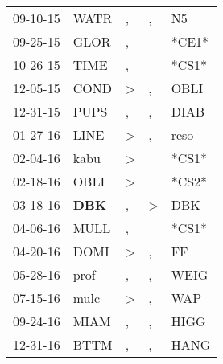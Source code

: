\begin{supertabular}{p{0.07\textwidth}p{0.06\textwidth}p{0.02\textwidth}p{0.02\textwidth}p{0.06\textwidth}}
 09-10-15\textsuperscript{} &           WATR\textsuperscript{} &                , &             , &           N5\textsuperscript{} \\
 09-25-15\textsuperscript{} &           GLOR\textsuperscript{} &                , &               &                          *CE1* \\
 10-26-15\textsuperscript{} &           TIME\textsuperscript{} &                , &               &                          *CS1* \\
 12-05-15\textsuperscript{} &           COND\textsuperscript{} &     \textgreater &             , &         OBLI\textsuperscript{} \\
 12-31-15\textsuperscript{} &           PUPS\textsuperscript{} &                , &             , &         DIAB\textsuperscript{} \\
 01-27-16\textsuperscript{} &           LINE\textsuperscript{} &     \textgreater &             , &         reso\textsuperscript{} \\
 02-04-16\textsuperscript{} &           kabu\textsuperscript{} &     \textgreater &               &                          *CS1* \\
 02-18-16\textsuperscript{} &           OBLI\textsuperscript{} &     \textgreater &               &                          *CS2* \\
 03-18-16\textsuperscript{} &   \textbf{DBK\textsuperscript{}} &                , &  \textgreater &          DBK\textsuperscript{} \\
 04-06-16\textsuperscript{} &           MULL\textsuperscript{} &                , &               &                          *CS1* \\
 04-20-16\textsuperscript{} &           DOMI\textsuperscript{} &     \textgreater &             , &           FF\textsuperscript{} \\
 05-28-16\textsuperscript{} &           prof\textsuperscript{} &                , &             , &         WEIG\textsuperscript{} \\
 07-15-16\textsuperscript{} &           mulc\textsuperscript{} &     \textgreater &             , &          WAP\textsuperscript{} \\
 09-24-16\textsuperscript{} &           MIAM\textsuperscript{} &                , &             , &         HIGG\textsuperscript{} \\
 12-31-16\textsuperscript{} &           BTTM\textsuperscript{} &                , &             , &         HANG\textsuperscript{} \\

\end{supertabular}
